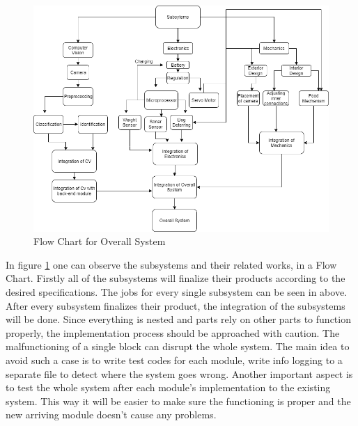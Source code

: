 \begin{figure}[h!]
    \centering
    \includegraphics[width=\linewidth]{img/FlowChart.png}
    \caption{Flow Chart for Overall System}
    \label{fig:Flow Chart for Overall System}
\end{figure}


In figure \ref{fig:Flow Chart for Overall System} one can observe the subsystems and their related works, in a Flow Chart. Firstly all of the subsystems will finalize their products according to the desired specifications. The jobs for every single subsystem can be seen in above. After every subsystem finalizes their product, the integration of the subsystems will be done. Since everything is nested and parts rely on other parts to function properly, the implementation process should be approached with caution. The malfunctioning of a single block can disrupt the whole system. The main idea to avoid such a case is to write test codes for each module, write info logging to a separate file to detect where the system goes wrong. Another important aspect is to test the whole system after each module's implementation to the existing system. This way it will be easier to make sure the functioning is proper and the new arriving module doesn't cause any problems. 
